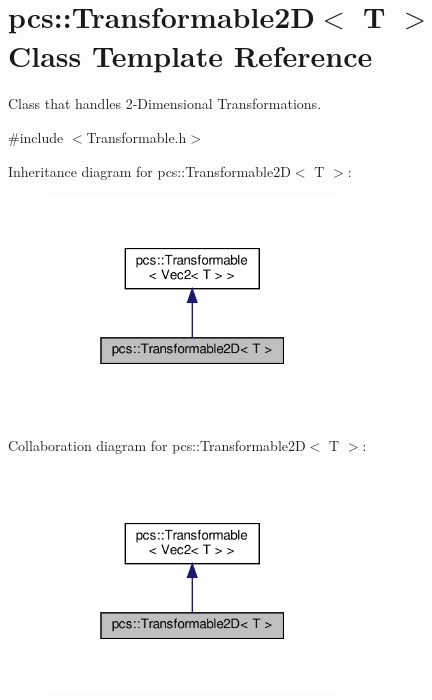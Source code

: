 \hypertarget{classpcs_1_1Transformable2D}{}\section{pcs\+:\+:Transformable2D$<$ T $>$ Class Template Reference}
\label{classpcs_1_1Transformable2D}


Class that handles 2-\/\+Dimensional Transformations.  




{\ttfamily \#include $<$Transformable.\+h$>$}



Inheritance diagram for pcs\+:\+:Transformable2D$<$ T $>$\+:\nopagebreak
\begin{figure}[H]
\begin{center}
\leavevmode
\includegraphics[width=217pt]{classpcs_1_1Transformable2D__inherit__graph}
\end{center}
\end{figure}


Collaboration diagram for pcs\+:\+:Transformable2D$<$ T $>$\+:\nopagebreak
\begin{figure}[H]
\begin{center}
\leavevmode
\includegraphics[width=217pt]{classpcs_1_1Transformable2D__coll__graph}
\end{center}
\end{figure}
